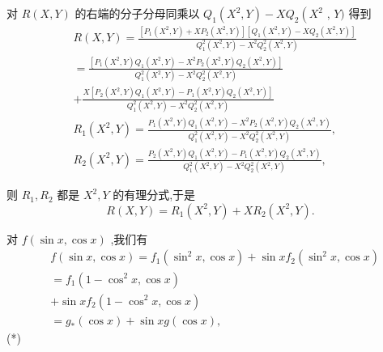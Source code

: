 对 $R\left( {X,Y}\right)$ 的右端的分子分母同乘以 ${Q}_{1}\left( {{X}^{2},Y}\right)  - X{Q}_{2}\left( {X}^{2}\right.$ , $Y)$ 得到
\begin{align*}
	&R\left( {X,Y}\right)  = \frac{\left\lbrack  {{P}_{1}\left( {{X}^{2},Y}\right)  + X{P}_{2}\left( {{X}^{2},Y}\right) }\right\rbrack  \left\lbrack  {{Q}_{1}\left( {{X}^{2},Y}\right)  - X{Q}_{2}\left( {{X}^{2},Y}\right) }\right\rbrack  }{{Q}_{1}^{2}\left( {{X}^{2},Y}\right)  - {X}^{2}{Q}_{2}^{2}\left( {{X}^{2},Y}\right) }\\
	&= \frac{\left\lbrack  {P}_{1}\left( {X}^{2},Y\right) {Q}_{1}\left( {X}^{2},Y\right)  - {X}^{2}{P}_{2}\left( {X}^{2},Y\right) {Q}_{2}\left( {X}^{2},Y\right) \right\rbrack  }{{Q}_{1}^{2}\left( {{X}^{2},Y}\right)  - {X}^{2}{Q}_{2}^{2}\left( {{X}^{2},Y}\right) }\\
	&+ \frac{X\left\lbrack  {{P}_{2}\left( {{X}^{2},Y}\right) {Q}_{1}\left( {{X}^{2},Y}\right)  - {P}_{1}\left( {{X}^{2},Y}\right) {Q}_{2}\left( {{X}^{2},Y}\right) }\right\rbrack  }{{Q}_{1}^{2}\left( {{X}^{2},Y}\right)  - {X}^{2}{Q}_{2}^{2}\left( {{X}^{2},Y}\right) }\\
	&{R}_{1}\left( {{X}^{2},Y}\right)  = \frac{{P}_{1}\left( {{X}^{2},Y}\right) {Q}_{1}\left( {{X}^{2},Y}\right)  - {X}^{2}{P}_{2}\left( {{X}^{2},Y}\right) {Q}_{2}\left( {{X}^{2},Y}\right) }{{Q}_{1}^{2}\left( {{X}^{2},Y}\right)  - {X}^{2}{Q}_{2}^{2}\left( {{X}^{2},Y}\right) },\\
	&{R}_{2}\left( {{X}^{2},Y}\right)  = \frac{{P}_{2}\left( {{X}^{2},Y}\right) {Q}_{1}\left( {{X}^{2},Y}\right)  - {P}_{1}\left( {{X}^{2},Y}\right) {Q}_{2}\left( {{X}^{2},Y}\right) }{{Q}_{1}^{2}\left( {{X}^{2},Y}\right)  - {X}^{2}{Q}_{2}^{2}\left( {{X}^{2},Y}\right) },
\end{align*}

则 ${R}_{1},{R}_{2}$ 都是 ${X}^{2},Y$ 的有理分式,于是
$$R\left( {X,Y}\right)  = {R}_{1}\left( {{X}^{2},Y}\right)  + X{R}_{2}\left( {{X}^{2},Y}\right) .$$

对 $f\left( {\sin x,\cos x}\right)$ ,我们有
\begin{align*}
	&f\left( {\sin x,\cos x}\right)  = {f}_{1}\left( {{\sin }^{2}x,\cos x}\right)  + \sin x{f}_{2}\left( {{\sin }^{2}x,\cos x}\right)\\
	&= {f}_{1}\left( {1 - {\cos }^{2}x,\cos x}\right)\\
	&+ \sin x{f}_{2}\left( {1 - {\cos }^{2}x,\cos x}\right)\\
	&= {g}_{ * }\left( {\cos x}\right)  + \sin {xg}\left( {\cos x}\right) ,
\end{align*}
(*)

